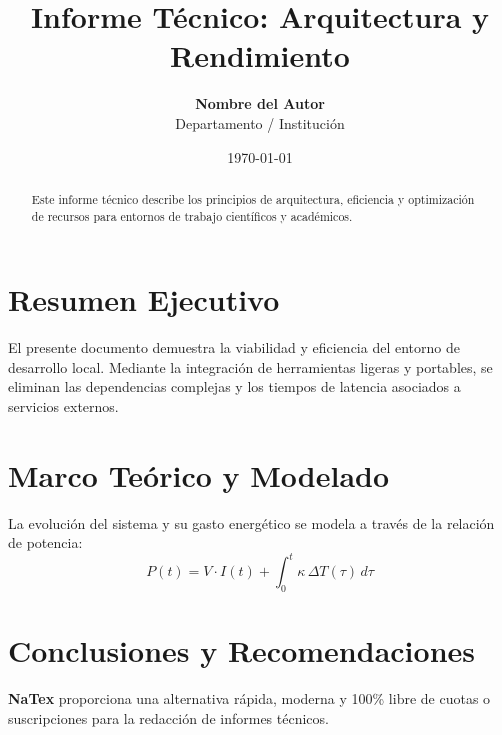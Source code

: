 \documentclass[11pt]{article}
\title{\Huge \bfseries \color{natexorange} Informe Técnico: Arquitectura y Rendimiento}
\author{\textbf{Nombre del Autor} \\ Departamento / Institución}
\date{\today}
\begin{document}
\maketitle

\begin{abstract}
Este informe técnico describe los principios de arquitectura, eficiencia y optimización de recursos para entornos de trabajo científicos y académicos.
\end{abstract}

\section{Resumen Ejecutivo}
El presente documento demuestra la viabilidad y eficiencia del entorno de desarrollo local. Mediante la integración de herramientas ligeras y portables, se eliminan las dependencias complejas y los tiempos de latencia asociados a servicios externos.

\section{Marco Teórico y Modelado}
La evolución del sistema y su gasto energético se modela a través de la relación de potencia:
\begin{equation}
  P(t) = V \cdot I(t) + \int_{0}^{t} \kappa \, \Delta T(\tau) \, d\tau
\end{equation}

\section{Conclusiones y Recomendaciones}
\textbf{NaTex} proporciona una alternativa rápida, moderna y 100\% libre de cuotas o suscripciones para la redacción de informes técnicos.
\end{document}
